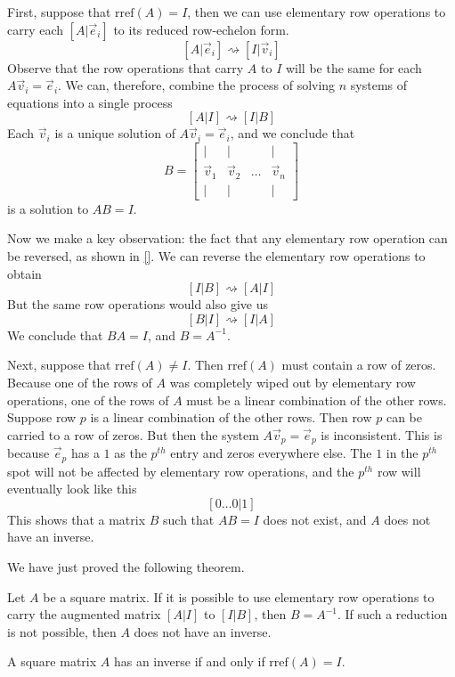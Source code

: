 \documentclass{ximera}
\begin{document}
First, suppose that $\mbox{rref}(A)=I$, then we can use elementary row operations to carry each $[A|\vec{e}_i]$ to its reduced row-echelon form.
$$[A|\vec{e}_i]\rightsquigarrow [I|\vec{v}_i]$$
Observe that the row operations that carry $A$ to $I$ will be the same for each $A\vec{v}_i=\vec{e}_i$.  We can, therefore, combine the process of solving $n$ systems of equations into a single process
$$[A|I]\rightsquigarrow [I|B]$$
Each $\vec{v}_i$ is a unique solution of $A\vec{v}_i=\vec{e}_i$, and we conclude that $$B=\begin{bmatrix}
           | & |& &|\\
		\vec{v}_1 & \vec{v}_2 &\dots &\vec{v}_n\\
		|&| & &|
         \end{bmatrix}$$ is a solution to $AB=I$.  
 
Now we make a key observation: the fact that any elementary row operation can be reversed, as shown in \ref{}.  We can reverse the elementary row operations to obtain
$$[I|B]\rightsquigarrow [A|I]$$
But the same row operations would also give us
$$[B|I]\rightsquigarrow [I|A]$$
We conclude that $BA=I$, and $B=A^{-1}$.
         
Next, suppose that $\mbox{rref}(A)\neq I$.  Then $\mbox{rref}(A)$ must contain a row of zeros.  Because one of the rows of $A$ was completely wiped out by elementary row operations, one of the rows of $A$ must be a linear combination of the other rows.  Suppose row $p$ is a linear combination of the other rows.  Then row $p$ can be carried to a row of zeros. But then the system $A\vec{v}_p=\vec{e}_p$ is inconsistent.  This is because $\vec{e}_p$ has a $1$ as the $p^{th}$ entry and zeros everywhere else.  The $1$ in the $p^{th}$ spot will not be affected by elementary row operations, and the $p^{th}$ row will eventually look like this
$$[0\ldots 0|1]$$
This shows that a matrix $B$ such that $AB=I$ does not exist, and $A$ does not have an inverse.

We have just proved the following theorem.

\begin{theorem}\label{th:matrixinverse}
Let $A$ be a square matrix.  If it is possible to use elementary row operations to carry the augmented matrix $[A|I]$ to $[I|B]$, then $B=A^{-1}$.  If such a reduction is not possible, then $A$ does not have an inverse.
\end{theorem}

\begin{corollary}\label{cor:rrefI}
A square matrix $A$ has an inverse if and only if $\mbox{rref}(A)=I$.
\end{corollary}
\end{document}

